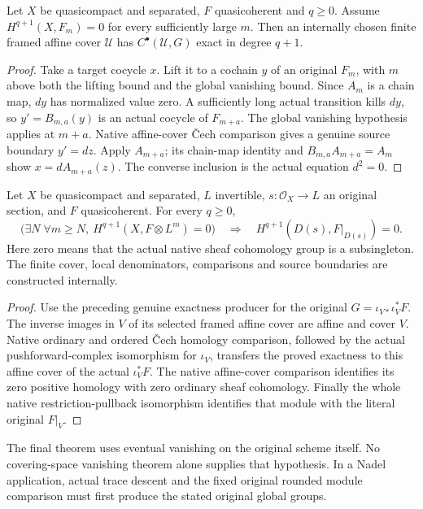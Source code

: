\begin{lemma}
\label{lem:cech-line-native-exact-from-global}
\leanok
Let $X$ be quasicompact and separated, $F$ quasicoherent and $q\geq0$.
Assume $H^{q+1}(X,F_m)=0$ for every sufficiently large $m$.
Then an internally chosen finite framed affine cover $\mathcal U$
has $C^\bullet(\mathcal U,G)$ exact in degree $q+1$.
\end{lemma}
\begin{proof}
Take a target cocycle $x$. Lift it to a cochain $y$ of an original
$F_m$, with $m$ above both the lifting bound and the global vanishing
bound. Since $A_m$ is a chain map, $dy$ has normalized value zero.
A sufficiently long actual transition kills $dy$, so
$y'=B_{m,a}(y)$ is an actual cocycle of $F_{m+a}$.
The global vanishing hypothesis applies at $m+a$. Native affine-cover
\v{C}ech comparison gives a genuine source boundary $y'=dz$.
Apply $A_{m+a}$; its chain-map identity and
$B_{m,a}A_{m+a}=A_m$ show $x=dA_{m+a}(z)$. The converse inclusion
is the actual equation $d^2=0$.
\end{proof}

\begin{theorem}
\label{thm:cech-line-native-section-open-vanishing}
\leanok
Let $X$ be quasicompact and separated, $L$ invertible,
$s:\mathcal O_X\to L$ an original section, and $F$ quasicoherent.
For every $q\geq0$,
\[
 \bigl(\exists N\;\forall m\geq N,\ H^{q+1}(X,F\otimes L^m)=0\bigr)
 \quad\Longrightarrow\quad H^{q+1}(D(s),F|_{D(s)})=0.
\]
Here zero means that the actual native sheaf cohomology group is a
subsingleton. The finite cover, local denominators, comparisons and
source boundaries are constructed internally.
\end{theorem}
\begin{proof}
Use the preceding genuine exactness producer for the original
$G=\iota_{V*}\iota_V^*F$. The inverse images in $V$ of its selected
framed affine cover are affine and cover $V$. Native ordinary and
ordered \v{C}ech homology comparison, followed by the actual
pushforward-complex isomorphism for $\iota_V$, transfers the proved
exactness to this affine cover of the actual $\iota_V^*F$.
The native affine-cover comparison identifies its zero positive
homology with zero ordinary sheaf cohomology. Finally the whole native
restriction-pullback isomorphism identifies that module with the
literal original $F|_V$.
\end{proof}

The final theorem uses eventual vanishing on the original scheme itself.
No covering-space vanishing theorem alone supplies that hypothesis. In a
Nadel application, actual trace descent and the fixed original rounded
module comparison must first produce the stated original global groups.

